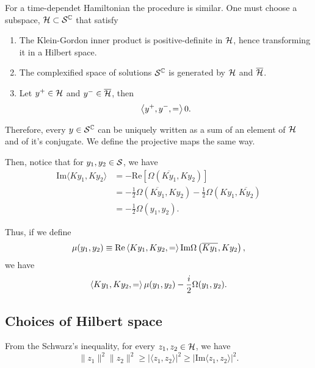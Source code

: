 For a time-dependet Hamiltonian the procedure is similar. One must choose a subspace, \({\mathcal{H}}\subset{\mathcal{S}}^{\mathbb{C}}\) that satisfy
\begin{enumerate}
    \item The Klein-Gordon inner product is positive-definite in \({\mathcal{H}}\), hence transforming it in a Hilbert space.
    \item The complexified space of solutions \({\mathcal{S}}^{\mathbb{C}}\) is generated by \({\mathcal{H}}\) and \(\overline{{\mathcal{H}}}\).
    \item Let \(y^+\in{\mathcal{H}}\) and \(y^-\in\overline{{\mathcal{H}}}\), then
    \begin{equation}
        \left\langle y^+,y^-, =\right\rangle0.
    \end{equation}
\end{enumerate}

Therefore, every \(y\in{\mathcal{S}}^{\mathbb{C}}\) can be uniquely written as a sum of an element of \({\mathcal{H}}\) and of it's conjugate. We define the projective maps the same way.

Then, notice that for \(y_1,y_2\in{\mathcal{S}}\), we have
\begin{subequations}
    \begin{align}
        \text{Im}\langle Ky_1,Ky_2\rangle&=-\text{Re}\left[\Omega\left(\overline{Ky_1},Ky_2\right)\right]\\
        &=-\frac{1}{2}\Omega\left(\overline{Ky_1},Ky_2\right)-\frac{1}{2}\Omega\left(Ky_1,\overline{Ky_2}\right)\\
        &=-\frac{1}{2}\Omega\left(y_1,y_2\right).
    \end{align}
\end{subequations}

Thus, if we define
\begin{equation}
    \mu(y_1,y_2)\equiv\text{Re}\left\langle Ky_1,Ky_2, =\right\rangle\text{Im}\Omega\left(\overline{Ky_1},Ky_2\right),
\end{equation}
we have
\begin{equation}
    \left\langle Ky_1,Ky_2, =\right\rangle\mu(y_1,y_2)-\frac{i}{2}\Omega(y_1,y_2).
\end{equation}

\subsection*{Choices of Hilbert space}\label{subsec:mu}
From the Schwarz's inequality, for every \(z_1,z_2\in{\mathcal{H}}\), we have
\begin{equation}
    \lVert z_1\rVert^2\lVert z_2\rVert^2\geq\lvert\langle z_1,z_2\rangle\rvert^2\geq\lvert\text{Im}\langle z_1,z_2\rangle\rvert^2.
\end{equation}

